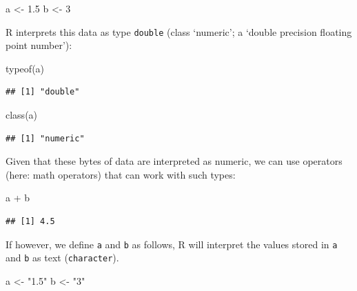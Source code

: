 \documentclass[
  12pt,
]{style/krantz}
\newenvironment{Shaded}{\begin{snugshade}}{\end{snugshade}}
\newcommand{\DecValTok}[1]{\textcolor[rgb]{0.00,0.00,0.81}{#1}}
\newcommand{\FloatTok}[1]{\textcolor[rgb]{0.00,0.00,0.81}{#1}}
\newcommand{\FunctionTok}[1]{\textcolor[rgb]{0.00,0.00,0.00}{#1}}
\newcommand{\NormalTok}[1]{#1}
\newcommand{\OtherTok}[1]{\textcolor[rgb]{0.56,0.35,0.01}{#1}}
\newcommand{\SpecialCharTok}[1]{\textcolor[rgb]{0.00,0.00,0.00}{#1}}
\newcommand{\StringTok}[1]{\textcolor[rgb]{0.31,0.60,0.02}{#1}}
\begin{document}
\begin{Shaded}
\begin{Highlighting}[]
\NormalTok{a }\OtherTok{\textless{}{-}} \FloatTok{1.5}
\NormalTok{b }\OtherTok{\textless{}{-}} \DecValTok{3}
\end{Highlighting}
\end{Shaded}

R interprets this data as type \texttt{double} (class `numeric'; a `double precision floating point number'):

\begin{Shaded}
\begin{Highlighting}[]
\FunctionTok{typeof}\NormalTok{(a)}
\end{Highlighting}
\end{Shaded}

\begin{verbatim}
## [1] "double"
\end{verbatim}

\begin{Shaded}
\begin{Highlighting}[]
\FunctionTok{class}\NormalTok{(a)}
\end{Highlighting}
\end{Shaded}

\begin{verbatim}
## [1] "numeric"
\end{verbatim}

Given that these bytes of data are interpreted as numeric, we can use operators (here: math operators) that can work with such types:

\begin{Shaded}
\begin{Highlighting}[]
\NormalTok{a }\SpecialCharTok{+}\NormalTok{ b}
\end{Highlighting}
\end{Shaded}

\begin{verbatim}
## [1] 4.5
\end{verbatim}

If however, we define \texttt{a} and \texttt{b} as follows, R will interpret the values stored in \texttt{a} and \texttt{b} as text (\texttt{character}).

\begin{Shaded}
\begin{Highlighting}[]
\NormalTok{a }\OtherTok{\textless{}{-}} \StringTok{"1.5"}
\NormalTok{b }\OtherTok{\textless{}{-}} \StringTok{"3"}
\end{Highlighting}
\end{Shaded}
\end{document}
